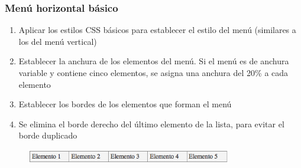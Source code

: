 \begin{frame}
\frametitle{Menú horizontal básico}

\begin{enumerate}
  \item Aplicar los estilos CSS básicos para establecer el estilo del menú (similares a los del menú vertical)
  \item  Establecer la anchura de los elementos del menú. Si el menú es de anchura variable y contiene cinco elementos, se asigna una anchura del 20\% a cada elemento
  \item Establecer los bordes de los elementos que forman el menú
  \item Se elimina el borde derecho del último elemento de la lista, para evitar el borde duplicado
\end{enumerate}


\begin{center}
\begin{figure}[p]
\includegraphics[width=0.8\textwidth]{figs/f0909.png}
\end{figure}
\end{center}

\end{frame}






%


